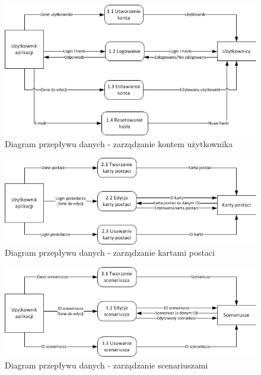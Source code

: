 \begin{figure}[h!]
\begin{center}
\centerline{\includegraphics[scale=1]{./img/DFD-user.png}}
\caption[Diagram przepływu danych]{Diagram przepływu danych - zarządzanie kontem użytkownika}
\label{fig:DFD-user}
\end{center}
\end{figure}

\begin{figure}[h!]
\begin{center}
\centerline{\includegraphics[scale=1]{./img/DFD-chars.png}}
\caption[Diagram przepływu danych]{Diagram przepływu danych - zarządzanie kartami postaci}
\label{fig:DFD-chars}
\end{center}
\end{figure}

\begin{figure}[h!]
\begin{center}
\centerline{\includegraphics[scale=1]{./img/DFD-scenarios.png}}
\caption[Diagram przepływu danych]{Diagram przepływu danych - zarządzanie scenariuszami}
\label{fig:DFD-scenarios}
\end{center}
\end{figure}

